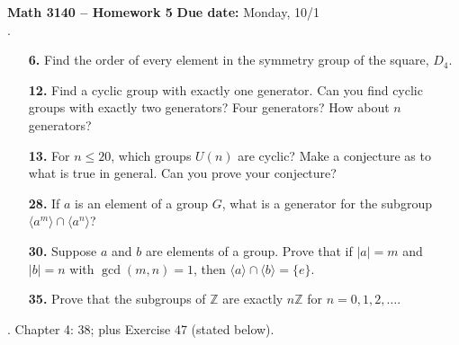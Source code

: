 \documentclass[12pt,reqno]{amsart}
\begin{document}
\thispagestyle{empty}

\noindent \textbf{Math 3140 -- Homework 5} \hfill {\bf Due date:} Monday, 10/1\\[4pt]
.

\begin{enumerate}

\item[{\bf 6.}]
Find the order of every element in the symmetry group of the square,
$D_4$.

\bigskip

\item[{\bf 12.}]
Find a cyclic group with exactly one generator.  Can you find cyclic
groups with exactly two generators?  Four generators?  How about $n$
generators?

\bigskip

\item[{\bf 13.}]
For $n \leq 20$, which groups $U(n)$ are cyclic?  Make a conjecture as
to what is true in general.  Can you prove your conjecture?  

\bigskip

\item[{\bf 28.}]
If $a$ is an element of a group $G$, what is a generator for the
subgroup $\langle a^m \rangle  \cap  \langle a^n \rangle $?
 

\bigskip

\item[{\bf 30.}]
Suppose $a$ and $b$ are elements of a group. Prove that if $|a|
= m$ and $|b| = n$ with $\gcd(m,n) = 1$, then $\langle a \rangle  \cap
\langle b \rangle  = \{ e \}$. 
 
\bigskip

\item[{\bf 35.}]
Prove that the subgroups of ${\mathbb Z}$ are exactly $n{\mathbb Z}$ for $n
= 0, 1, 2, \ldots$. 

\end{enumerate}

\bigskip

\bigskip

.  Chapter 4:  38; plus Exercise 47 (stated below).
\end{document}
